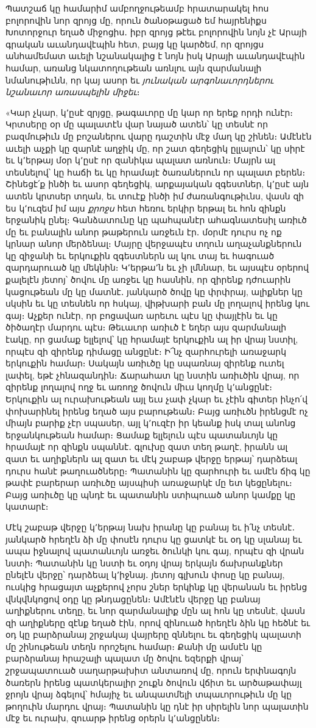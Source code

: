 \documentclass{article}
\begin{document}
{Պատշաճ կը համարիմ ամբողջութեամբ հրատարակել հոս բոլորովին նոր զրոյց մը, որուն ծանօթացած եմ հայրենիքս Խոտորջուր եղած միջոցիս․ իբր զրոյց թէեւ բոլորովին նոյն չէ Արայի գրական աւանդավէպին հետ, բայց կը կարծեմ, որ զրոյցս անհամեմատ աւելի նշանակալից է նոյն իսկ Արայի աւանդավէպին համար, առանց նկատողութեան առնլու այն զարմանալի նմանութիւնն, որ կայ ասոր եւ \emph{յունական արգոնաւորդներու նշանաւոր առասպելին միջեւ}։

«Կար չկար, կ՚ըսէ զրյցը, թագաւորը մը կար որ երեք որդի ունէր։ Կրտսերը օր մը պալատէն վար նայած ատեն՝ կը տեսնէ որ բազմութիւն մը բոշաներու վարը դաշտին մէջ մաղ կը շինեն։ Ամէնէն աւելի աչքի կը զարնէ աղջիկ մը, որ շատ գեղեցիկ ըլլալուն՝ կը սիրէ եւ կ՚երթայ մօր կ՚ըսէ որ զանիկա պալատ առնուն։ Մայրն ալ տեսնելով՝ կը հաճի եւ կը հրամայէ ծառաներուն որ պալատ բերեն։ Շինեցէ՛ք ինծի եւ ասոր գեղեցիկ, արքայական զգեստներ, կ՚ըսէ այն ատեն կրտսեր տղան, եւ տուէք ինծի իմ ժառանգութիւնս, վասն զի ես կ՚ուզեմ իմ այս \emph{քրոջս} հետ հեռու երկիր երթալ եւ հոն զինքն երջանիկ ընել։ Գանձատունը կը պահպանէր ահագնատեսիլ առիւծ մը եւ բանալին անոր թաթերուն առջեւն էր․ մօրմէ դուրս ոչ ոք կրնար անոր մերձենալ։ Մայրը վերջապէս տղուն աղաչանքներուն կը զիջանի եւ երկուքին զգեստներն ալ կու տայ եւ հագուած զարդարուած կը մեկնին։ Կ՚երթա՚ն եւ չի լմննար, եւ այսպէս օրերով քալելէն յետոյ՝ ծովու մը առջեւ կը հասնին, որ զիրենք դժուարին կացութեան մը կը մատնէ․ յանկարծ ծովը կը փրփրայ, ալիքներ կը սկսին եւ կը տեսնեն որ հսկայ, վիթխարի բան մը լողալով իրենց կու գայ։ Աչքեր ունէր, որ բոցավառ արեւու պէս կը փայլէին եւ կը ծիծաղէր մարդու պէս։ Թեւաւոր առիւծ է եղեր այս զարմանալի էակը, որ ցամաք ելլելով՝ կը հրամայէ երկուքին ալ իր վրայ նստիլ, որպէս զի զիրենք դիմացը անցընէ։ Ի՜նչ զարհուրելի առաջարկ երկուքին համար։ Սակայն առիւծը կը սպառնայ զիրենք ուտել լափել, եթէ չհնազանդին։ Ճարահատ կը նստին առիւծին վրայ, որ զիրենք լողալով ողջ եւ առողջ ծովուն միւս կողմը կ՚անցընէ։ Երկուքին ալ ուրախութեան այլ եւս չափ չկար եւ չէին գիտեր ինչո՛վ փոխարինել իրենց եղած այս բարութեան։ Բայց առիւծն իրենցմէ ոչ միայն բարիք չէր սպասեր, այլ կ՚ուզէր իր կեանք իսկ տալ անոնց երջանկութեան համար։ Ցամաք ելլելուն պէս պատանւոյն կը հրամայէ որ զինքն սպաննէ․ գլուխը զատ տեղ թաղէ, իրանն ալ զատ եւ աղիքներն ալ զատ եւ մէկ շաբաթ վերջը երթայ՝ դարձեալ դուրս հանէ թաղուածները։ Պատանին կը զարհուրի եւ ամէն ճիգ կը թափէ բարերար առիւծը այսպիսի առաջարկէ մը ետ կեցընելու։ Բայց առիւծը կը պնդէ եւ պատանին ստիպուած անոր կամքը կը կատարէ։

Մէկ շաբաթ վերջը կ՚երթայ նախ իրանը կը բանայ եւ ի՛նչ տեսնէ․ յանկարծ հրեղէն ձի մը փոսէն դուրս կը ցատկէ եւ օդ կը սլանայ եւ ապա իջնալով պատանւոյն առջեւ ծունկի կու գայ, որպէս զի վրան նստի։ Պատանին կը նստի եւ օդոյ վրայ երկայն ճախրանքներ ընելէն վերջը՝ դարձեալ կ՚իջնայ․ յետոյ գլխուն փոսը կը բանայ, ուսկից հրացայտ աչքերով չորս շներ երկինք կը վերանան եւ իրենց վնկվնկոցով օդը կը թնդացընեն։ Ամէնէն վերջը կը բանայ աղիքներու տեղը, եւ նոր զարմանալիք մըն ալ հոն կը տեսնէ, վասն զի աղիքները զէնք եղած էին, որով զինուած հրեղէն ձին կը հեծնէ եւ օդ կը բարձրանայ շրջակայ վայրերը զննելու եւ գեղեցիկ պալատի մը շինութեան տեղն որոշելու համար։ Քանի մը ամսէն կը բարձրանայ հրաշալի պալատ մը ծովու եզերքի վրայ՝ շրջապատուած սաղարթախիտ անտառով մը, որուն երփնագոյն ծառերն իրենց պատկերալիր շուքն ծովուն վճիտ եւ արծաթափայլ ջրոյն վրայ ձգելով՝ հմայիչ եւ անպատմելի տպաւորութիւն մը կը թողուին մարդու վրայ։ Պատանին կը դնէ իր սիրելին նոր պալատին մէջ եւ ուրախ, զուարթ իրենց օրերն կ՚անցընեն։

}
\end{document}
